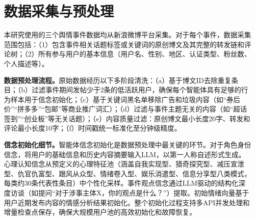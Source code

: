 \documentclass[lettersize,journal]{IEEEtran}
\begin{document}
\begin{table}[!t]
\centering
\caption{推荐系统参数配置}
\label{tab:rec_params}
\renewcommand{\arraystretch}{1.0}
\end{table}

\section{数据采集与预处理}
\label{app:data}

本研究使用的三个舆情事件数据均从新浪微博平台采集。对于每个事件，数据采集范围包括：（1）包含事件相关话题标签或关键词的原创博文及其完整的转发链和评论树；（2）所有参与用户的基本信息（用户名、性别、地区、认证类型、粉丝数、个人描述等）。

\textbf{数据预处理流程。}原始数据经历以下多阶段清洗：（a）基于博文ID去除重复条目；（b）过滤事件期间发帖少于2条的低活跃用户，确保每个智能体具有足够的行为样本用于信念初始化；（c）基于关键词黑名单移除广告和垃圾内容（如``券后价''``拼多多''``包邮''等商业推广词汇）；（d）过滤与事件主题无关的内容（如``超话签到''``创业板''等无关话题）；（e）内容质量过滤：原创博文最小长度20字、转发和评论最小长度10字；（f）时间戳统一标准化至分钟级精度。

\textbf{信念初始化细节。}智能体信念初始化是数据预处理中最关键的环节。对于角色身份信念，将用户的基础信息和历史内容摘要输入LLM，以第一人称自述形式生成。心理认知信念从预定义的心理特征池（涵盖自我实现型、猎奇探究型、减压宣泄型、仇官仇富型、跟风从众型、情绪卷入型、娱乐消遣型、信息分享型八类模式，每类约30条代表性条目）中个性化采样。事件观点信念通过LLM驱动的结构化深度访谈（如提问``对于涉事主体X，你的观点是什么？''）提取。初始情绪向量基于用户近期发布内容的情感分析结果初始化。整个初始化过程支持多API并发处理和增量检查点保存，确保大规模用户池的高效初始化和故障恢复。
\end{document}
